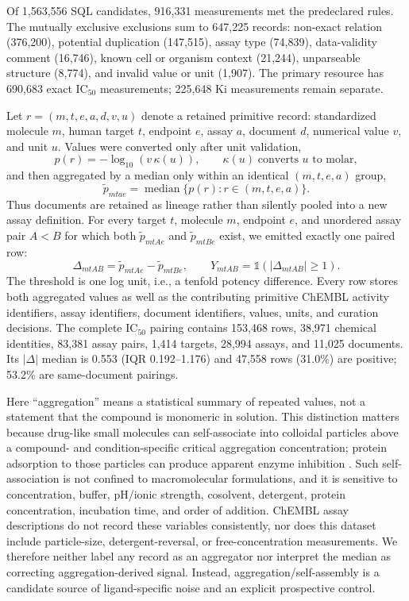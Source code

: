 \documentclass[letterpaper]{article}
\begin{document}
Of 1,563,556 SQL candidates, 916,331 measurements met the predeclared rules. The mutually exclusive exclusions sum to 647,225 records: non-exact relation (376,200), potential duplication (147,515), assay type (74,839), data-validity comment (16,746), known cell or organism context (21,244), unparseable structure (8,774), and invalid value or unit (1,907). The primary resource has 690,683 exact IC$_{50}$ measurements; 225,648 Ki measurements remain separate.

Let $r=(m,t,e,a,d,v,u)$ denote a retained primitive record: standardized molecule $m$, human target $t$, endpoint $e$, assay $a$, document $d$, numerical value $v$, and unit $u$. Values were converted only after unit validation,
\[
p(r)=-\log_{10}\!\left(v\,\kappa(u)\right), \qquad \kappa(u)\;\text{converts }u\text{ to molar},
\]
and then aggregated by a median only within an identical $(m,t,e,a)$ group,
\[
\tilde p_{mtae}=\operatorname{median}\{p(r):r\in(m,t,e,a)\}.
\]
Thus documents are retained as lineage rather than silently pooled into a new assay definition. For every target $t$, molecule $m$, endpoint $e$, and unordered assay pair $A<B$ for which both $\tilde p_{mtAe}$ and $\tilde p_{mtBe}$ exist, we emitted exactly one paired row:
\[
\Delta_{mtAB}=\tilde p_{mtAe}-\tilde p_{mtBe}, \qquad
Y_{mtAB}=\mathbb{1}\left(|\Delta_{mtAB}|\geq1\right).
\]
The threshold is one log unit, i.e., a tenfold potency difference. Every row stores both aggregated values as well as the contributing primitive ChEMBL activity identifiers, assay identifiers, document identifiers, values, units, and curation decisions. The complete IC$_{50}$ pairing contains 153,468 rows, 38,971 chemical identities, 83,381 assay pairs, 1,414 targets, 28,994 assays, and 11,025 documents. Its $|\Delta|$ median is 0.553 (IQR 0.192--1.176) and 47,558 rows (31.0\%) are positive; 53.2\% are same-document pairings.

Here ``aggregation'' means a statistical summary of repeated values, not a statement that the compound is monomeric in solution. This distinction matters because drug-like small molecules can self-associate into colloidal particles above a compound- and condition-specific critical aggregation concentration; protein adsorption to those particles can produce apparent enzyme inhibition \citep{mcgovern2002detergent,feng2018colloidal}. Such self-association is not confined to macromolecular formulations, and it is sensitive to concentration, buffer, pH/ionic strength, cosolvent, detergent, protein concentration, incubation time, and order of addition. ChEMBL assay descriptions do not record these variables consistently, nor does this dataset include particle-size, detergent-reversal, or free-concentration measurements. We therefore neither label any record as an aggregator nor interpret the median as correcting aggregation-derived signal. Instead, aggregation/self-assembly is a candidate source of ligand-specific noise and an explicit prospective control.
\end{document}
